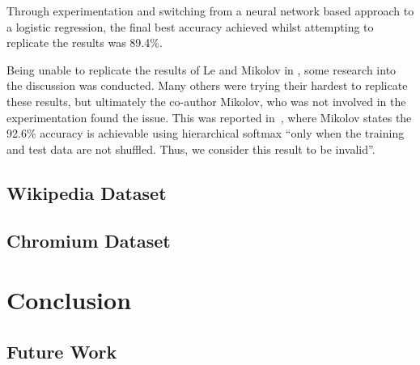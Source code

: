\documentclass[11pt]{article}
\begin{document}
Through experimentation and switching from a neural network based approach to a logistic regression, the final best accuracy achieved whilst attempting to replicate the results was 89.4\%.

Being unable to replicate the results of Le and Mikolov in \cite{le2014distributed}, some research into the discussion was conducted. Many others were trying their hardest to replicate these results, but ultimately the co-author Mikolov, who was not involved in the experimentation found the issue. This was reported in~\cite{mesnil2014ensemble}, where Mikolov states the 92.6\% accuracy is achievable using hierarchical softmax ``only when the training and test data are not shuffled. Thus, we consider this result to be invalid''. 

\subsection*{Wikipedia Dataset}

\subsection*{Chromium Dataset}


\section*{Conclusion}


\subsection*{Future Work}

\printbibliography
\end{document}
